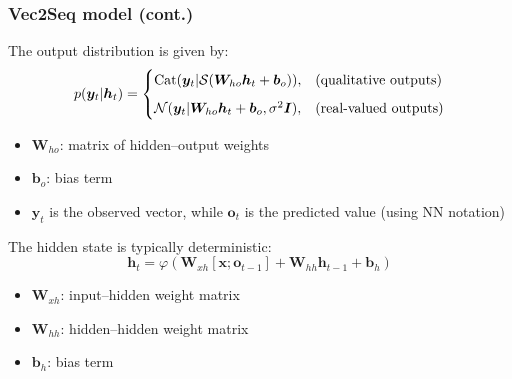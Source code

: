 \documentclass[smaller]{beamer}
\begin{document}
\begin{frame}
  \frametitle{Vec2Seq model (cont.)}
  \pe
  The output distribution is given by:
  \begin{equation}
    p(\bm y_{t}|\bm h_{t}) =
    \begin{cases}
      \text{Cat}(\bm y_{t}|\mathcal{S}(\bm W_{ho}\bm h_{t} + \bm b_{o})) , & \text{(qualitative outputs)} \\[2mm]
      \mathcal{N}(\bm y_{t}|\bm W_{ho}\bm h_{t} + \bm b_{o}, \sigma^{2}\bm I), & \text{(real-valued outputs)}
    \end{cases}
  \end{equation}

  \pe 
  \begin{itemize}
  \item $\bm W_{ho}$: matrix of hidden--output weights\pe
  \item $\bm b_o$: bias term\pe
  \item $\bm y_t$ is the observed vector, while $\bm o_t$ is the predicted value (using NN notation)
  \end{itemize}
  \pe
  The hidden state is typically deterministic: \pe
  \begin{equation}
    \bm h_{t} = \varphi(\bm W_{xh}[\bm x;\bm o_{t-1}] + \bm W_{hh}\bm h_{t-1} + \bm b_{h})
  \end{equation}  \pe
  \begin{itemize}
  \item $\bm W_{xh}$: input--hidden weight matrix\pe
  \item  $\bm W_{hh}$: hidden--hidden weight matrix\pe
  \item $\bm b_h$: bias term
  \end{itemize}
\end{frame}
\end{document}

